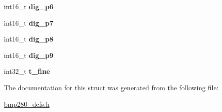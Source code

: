 \begin{DoxyCompactItemize}
int16\+\_\+t {\bfseries dig\+\_\+p6}
\item 
\mbox{\label{structbmp280__calib__param_abbe09c23a6dda945d69bd6c04b19a1fa}} 
int16\+\_\+t {\bfseries dig\+\_\+p7}
\item 
\mbox{\label{structbmp280__calib__param_ab0b8da3335b2117efbc3db1debf47b86}} 
int16\+\_\+t {\bfseries dig\+\_\+p8}
\item 
\mbox{\label{structbmp280__calib__param_a2eedb0f856bef96e6424e8e957c81ee1}} 
int16\+\_\+t {\bfseries dig\+\_\+p9}
\item 
\mbox{\label{structbmp280__calib__param_a122080a46a8777a2edda114f341b6b35}} 
int32\+\_\+t {\bfseries t\+\_\+fine}
\end{DoxyCompactItemize}


The documentation for this struct was generated from the following file\+:\begin{DoxyCompactItemize}
\item 
\mbox{\hyperlink{bmp280__defs_8h}{bmp280\+\_\+defs.\+h}}\end{DoxyCompactItemize}
